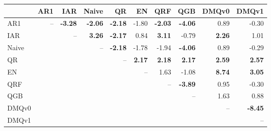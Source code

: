 \begin{tabular}{lrrrrrrrrr}
\toprule
 & AR1 & IAR & Naive & QR & EN & QRF & QGB & DMQv0 & DMQv1 \\
\midrule
AR1 & -- & \textbf{-3.28} & \textbf{-2.06} & \textbf{-2.18} & -1.80 & \textbf{-2.03} & \textbf{-4.06} & 0.89 & -0.30 \\
IAR &  & -- & \textbf{3.26} & \textbf{-2.17} & 0.84 & \textbf{3.11} & -0.79 & \textbf{2.26} & 1.01 \\
Naive &  &  & -- & \textbf{-2.18} & -1.78 & -1.94 & \textbf{-4.06} & 0.89 & -0.29 \\
QR &  &  &  & -- & \textbf{2.17} & \textbf{2.18} & \textbf{2.17} & \textbf{2.59} & \textbf{2.57} \\
EN &  &  &  &  & -- & 1.63 & -1.08 & \textbf{8.74} & \textbf{3.05} \\
QRF &  &  &  &  &  & -- & \textbf{-3.89} & 0.95 & -0.30 \\
QGB &  &  &  &  &  &  & -- & 1.63 & 0.88 \\
DMQv0 &  &  &  &  &  &  &  & -- & \textbf{-8.45} \\
DMQv1 &  &  &  &  &  &  &  &  & -- \\
\bottomrule
\end{tabular}
